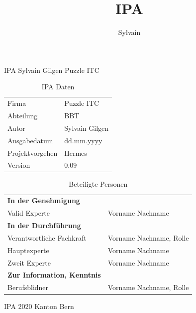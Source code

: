\documentclass{report}
\author{Sylvain}
\title{IPA}
\begin{document}
\begin{titlepage}
  \Huge IPA Sylvain Gilgen Puzzle ITC\normalsize
\bigbreak
\begin{table}[h!]
    \begin{tabular}{|R{0.2\textwidth}|L{0.7\textwidth}|}
        \hline
          \\[12pt]
        \hline
        Firma & Puzzle ITC \\
        \hline
        Abteilung & BBT \\
        \hline
        Autor & Sylvain Gilgen \\
        \hline
        Ausgabedatum & dd.mm.yyyy \\
        \hline
        Projektvorgehen & Hermes \\
        \hline
        Version & 0.09 \\
        \hline
      \end{tabular}
      \caption{IPA Daten}
\end{table}
\begin{table}[!h]
    \begin{tabular}{|L{0.4\textwidth}|L{0.5\textwidth}|}
        \hline
          \\[12pt]
        \hline
        \textbf{In der Genehmigung} & \\
        \hline
        Valid Experte & Vorname Nachname \\
        \hline
        \textbf{In der Durchführung} & \\
        \hline
        Verantwortliche Fachkraft & Vorname Nachname, Rolle \\
        \hline
        Hauptexperte & Vorname Nachname \\
        \hline
        Zweit Experte & Vorname Nachname \\
        \hline
        \textbf{Zur Information, Kenntnis} & \\
        \hline
        Berufsblidner & Vorname Nachname, Rolle \\
        \hline
    \end{tabular}
    \caption{Beteiligte Personen}
\end{table}
\Huge IPA 2020 Kanton Bern
\end{titlepage}




\end{document}
